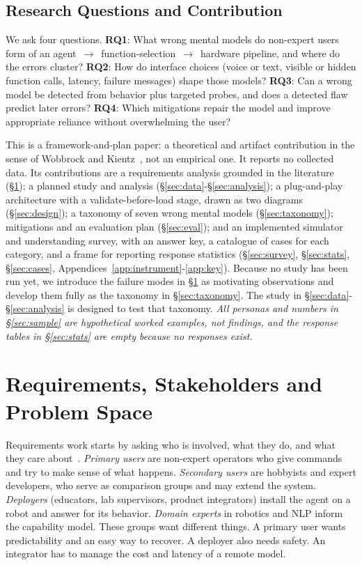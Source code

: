 \documentclass[sigconf]{acmart}
\begin{document}
\subsection{Research Questions and Contribution}
We ask four questions. \textbf{RQ1}: What wrong mental models do non-expert users form of an agent~$\rightarrow$~function-selection~$\rightarrow$~hardware pipeline, and where do the errors cluster? \textbf{RQ2}: How do interface choices (voice or text, visible or hidden function calls, latency, failure messages) shape those models? \textbf{RQ3}: Can a wrong model be detected from behavior plus targeted probes, and does a detected flaw predict later errors? \textbf{RQ4}: Which mitigations repair the model and improve appropriate reliance without overwhelming the user?

This is a framework-and-plan paper: a theoretical and artifact contribution in the sense of Wobbrock and Kientz~\cite{wobbrock2016research}, not an empirical one. It reports no collected data. Its contributions are a requirements analysis grounded in the literature (\S\ref{sec:req}); a planned study and analysis (\S\ref{sec:data}-\S\ref{sec:analysis}); a plug-and-play architecture with a validate-before-load stage, drawn as two diagrams (\S\ref{sec:design}); a taxonomy of seven wrong mental models (\S\ref{sec:taxonomy}); mitigations and an evaluation plan (\S\ref{sec:eval}); and an implemented simulator and understanding survey, with an answer key, a catalogue of cases for each category, and a frame for reporting response statistics (\S\ref{sec:survey}, \S\ref{sec:stats}, \S\ref{sec:cases}, Appendices~\ref{app:instrument}-\ref{app:key}). Because no study has been run yet, we introduce the failure modes in \S\ref{sec:req} as motivating observations and develop them fully as the taxonomy in \S\ref{sec:taxonomy}. The study in \S\ref{sec:data}-\S\ref{sec:analysis} is designed to test that taxonomy. \emph{All personas and numbers in \S\ref{sec:sample} are hypothetical worked examples, not findings, and the response tables in \S\ref{sec:stats} are empty because no responses exist.}

\section{Requirements, Stakeholders and Problem Space}\label{sec:req}

Requirements work starts by asking who is involved, what they do, and what they care about~\cite{preece2023interaction}. \emph{Primary users} are non-expert operators who give commands and try to make sense of what happens. \emph{Secondary users} are hobbyists and expert developers, who serve as comparison groups and may extend the system. \emph{Deployers} (educators, lab supervisors, product integrators) install the agent on a robot and answer for its behavior. \emph{Domain experts} in robotics and NLP inform the capability model. These groups want different things. A primary user wants predictability and an easy way to recover. A deployer also needs safety. An integrator has to manage the cost and latency of a remote model.
\end{document}
